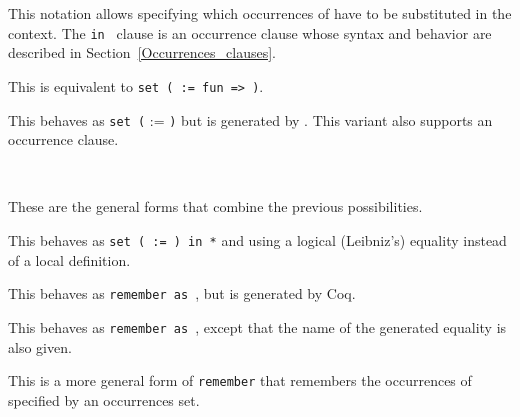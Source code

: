 \begin{Variants}

\item {}

This notation allows specifying which occurrences of {\term} have to
be substituted in the context. The {\tt in {\occgoalset}} clause is an
occurrence clause whose syntax and behavior are described in
Section~\ref{Occurrences_clauses}.

\item {}

  This is equivalent to {\tt set ( {\ident} := fun
  \nelistnosep{\binder} => {\term} )}.

\item {}

  This behaves as {\tt set (} {\ident} := {\term} {\tt )} but {\ident}
  is generated by {\Coq}. This variant also supports an occurrence clause.

\item {}\\
      {}

  These are the general forms that combine the previous possibilities.

\item {}

  This behaves as {\tt set ( {\ident} := {\term} ) in *} and using a
  logical (Leibniz's) equality instead of a local definition.

\item {}

  This behaves as {\tt remember {\term} as {\ident}}, but {\ident}
  is generated by Coq.

\item {}

  This behaves as {\tt remember {\term} as {\ident}}, except
  that the name of the generated equality is also given.

\item {}

  This is a more general form of {\tt remember} that remembers the
  occurrences of {\term} specified by an occurrences set.


\end{Variants}
